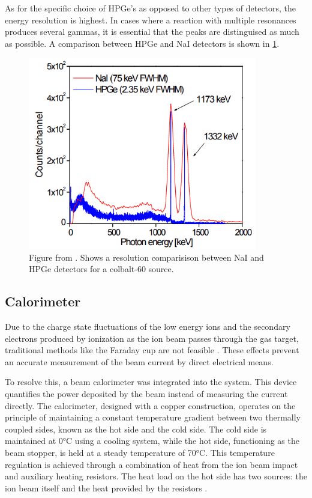 \documentclass[a4paper,12pt]{article}
\begin{document}
As for the specific choice of HPGe's as opposed to other types of detectors, the energy resolution is highest.  In cases where a reaction with multiple resonances produces several gammas, it is essential that the peaks are distinguised as much as possible. A comparison between HPGe and NaI detectors is shown in \ref{fig:detector_compare}.

\begin{figure}[h!]
    \centering
    \includegraphics[width=10cm]{detector_compare.png}
    \caption{Figure from \cite{ByunLectureNotes}. Shows a resolution comparisison between NaI and HPGe detectors for a colbalt-60 source.}
    \label{fig:detector_compare}
\end{figure}



\subsection{Calorimeter}\label{calorimeter}

Due to the charge state fluctuations of the low energy ions and the secondary electrons produced by ionization as the ion beam passes through the gas target, traditional methods like the Faraday cup are not feasible \cite{cavanna2015, chiara}. These effects prevent an accurate measurement of the beam current by direct electrical means.

To resolve this, a beam calorimeter was integrated into the system. This device quantifies the power deposited by the beam instead of measuring the current directly. The calorimeter, designed with a copper construction, operates on the principle of maintaining a constant temperature gradient between two thermally coupled sides, known as the hot side and the cold side. The cold side is maintained at 0°C using a cooling system, while the hot side, functioning as the beam stopper, is held at a steady temperature of 70°C. This temperature regulation is achieved through a combination of heat from the ion beam impact and auxiliary heating resistors.  The heat load on the hot side has two sources: the ion beam itself and the heat provided by the resistors \cite{masha2021}. 
\end{document}
